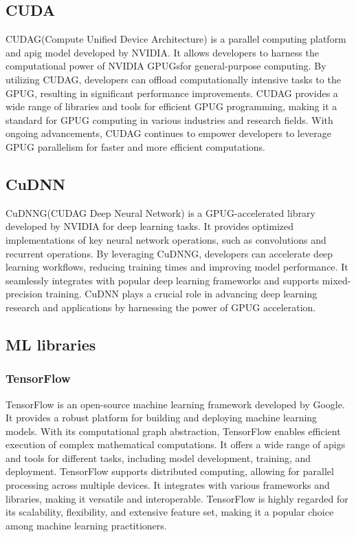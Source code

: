 \subsection{CUDA}\label{subsec:cuda}
\gls{CUDAG}\glsfirstoccur (Compute Unified Device Architecture) is a parallel computing platform and \gls{apig} model developed by NVIDIA. 
It allows developers to harness the computational power of NVIDIA \gls{GPUG}s\glsfirstoccur for general-purpose computing. 
By utilizing \gls{CUDAG}, developers can offload computationally intensive tasks to the \gls{GPUG}, resulting in significant performance improvements. 
\gls{CUDAG} provides a wide range of libraries and tools for efficient \gls{GPUG} programming, making it a standard for \gls{GPUG} computing in various industries and research fields. 
With ongoing advancements, \gls{CUDAG} continues to empower developers to leverage \gls{GPUG} parallelism for faster and more efficient computations.

\subsection{CuDNN}\label{subsec:cudnn}
\gls{CuDNNG}\glsfirstoccur (\gls{CUDAG} Deep Neural Network) is a \gls{GPUG}-accelerated library developed by NVIDIA for deep learning tasks. 
It provides optimized implementations of key neural network operations, such as convolutions and recurrent operations. 
By leveraging \gls{CuDNNG}, developers can accelerate deep learning workflows, reducing training times and improving model performance. 
It seamlessly integrates with popular deep learning frameworks and supports mixed-precision training. 
CuDNN plays a crucial role in advancing deep learning research and applications by harnessing the power of \gls{GPUG} acceleration.

\subsection{ML libraries}\label{subsec:mllib}
\subsubsection*{TensorFlow}\label{subsubsec:tensorflow}
TensorFlow is an open-source machine learning framework developed by Google. It provides a robust platform for building and deploying machine learning models. 
With its computational graph abstraction, TensorFlow enables efficient execution of complex mathematical computations. 
It offers a wide range of \gls{apig}s and tools for different tasks, including model development, training, and deployment. 
TensorFlow supports distributed computing, allowing for parallel processing across multiple devices. It integrates with various frameworks and libraries, making it versatile and interoperable. 
TensorFlow is highly regarded for its scalability, flexibility, and extensive feature set, making it a popular choice among machine learning practitioners.
